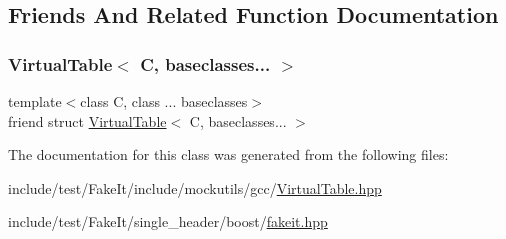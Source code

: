 \subsection{Friends And Related Function Documentation}
\mbox{\label{classfakeit_1_1VirtualTable_1_1Handle_a21a2c844059fe83d00ba9c9e4c3c977b}} 
\subsubsection{\texorpdfstring{VirtualTable$<$ C, baseclasses... $>$}{VirtualTable< C, baseclasses... >}}
{\footnotesize\ttfamily template$<$class C, class ... baseclasses$>$ \\
friend struct \mbox{\hyperlink{structfakeit_1_1VirtualTable}{Virtual\+Table}}$<$ C, baseclasses... $>$\hspace{0.3cm}{\ttfamily [friend]}}



The documentation for this class was generated from the following files\+:\begin{DoxyCompactItemize}
\item 
include/test/\+Fake\+It/include/mockutils/gcc/\mbox{\hyperlink{gcc_2VirtualTable_8hpp}{Virtual\+Table.\+hpp}}\item 
include/test/\+Fake\+It/single\+\_\+header/boost/\mbox{\hyperlink{single__header_2boost_2fakeit_8hpp}{fakeit.\+hpp}}\end{DoxyCompactItemize}

